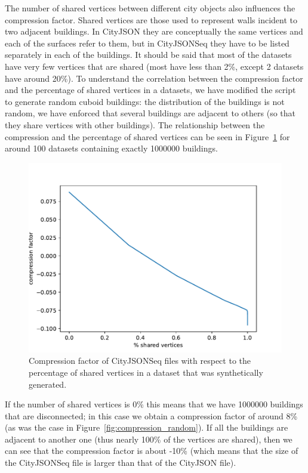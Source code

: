 \documentclass{isprs} %
\begin{document}
The number of shared vertices between different city objects also influences the compression factor. 
Shared vertices are those used to represent walls incident to two adjacent buildings.
In CityJSON they are conceptually the same vertices and each of the surfaces refer to them, but in CityJSONSeq they have to be listed separately in each of the buildings.
It should be said that most of the datasets have very few vertices that are shared (most have less than 2\%, except 2 datasets have around 20\%).
To understand the correlation between the compression factor and the percentage of shared vertices in a datasets, we have modified the script to generate random cuboid buildings: the distribution of the buildings is not random, we have enforced that several buildings are adjacent to others (so that they share vertices with other buildings).
The relationship between the compression and the percentage of shared vertices can be seen in Figure~\ref{fig:compression_adjacent} for around 100 datasets containing exactly \num{1000000} buildings.
\begin{figure}
  \centering
  \includegraphics[width=\linewidth]{figs/compression_adjacent.pdf}
  \caption{Compression factor of CityJSONSeq files with respect to the percentage of shared vertices in a dataset that was synthetically generated.}%
\label{fig:compression_adjacent}
\end{figure}
If the number of shared vertices is 0\% this means that we have \num{1000000} buildings that are disconnected; in this case we obtain a compression factor of around 8\% (as was the case in Figure~\ref{fig:compression_random}).
If all the buildings are adjacent to another one (thus nearly 100\% of the vertices are shared), then we can see that the compression factor is about -10\% (which means that the size of the CityJSONSeq file is larger than that of the CityJSON file).
%
\end{document}
